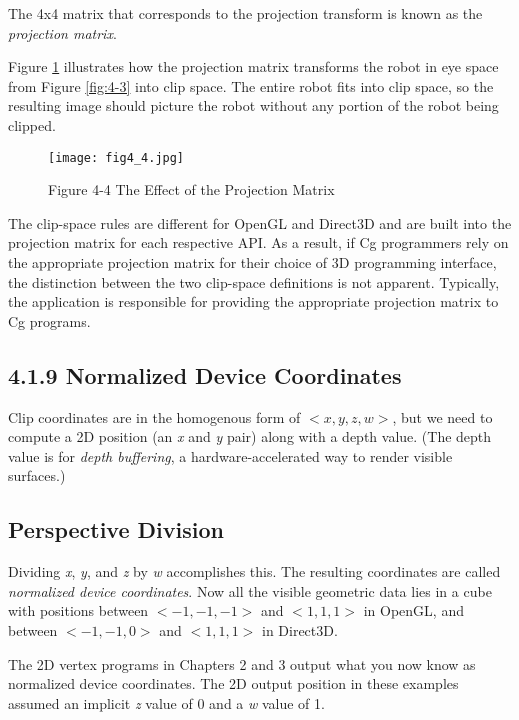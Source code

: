 \documentclass[../main.tex]{subfiles}
\begin{document}
The 4x4 matrix that corresponds to the projection transform is known as the \textit{projection matrix}.

Figure \ref{fig:4-4} illustrates how the projection matrix transforms the robot in eye space from Figure \ref{fig:4-3} into clip space. The entire robot fits into clip space, so the resulting image should picture the robot without any portion of the robot being clipped.

\begin{figure}
    \centering
    \texttt{[image: fig4\_4.jpg]}
    \caption{Figure 4-4 The Effect of the Projection Matrix}
    \label{fig:4-4}
\end{figure}

The clip-space rules are different for OpenGL and Direct3D and are built into the projection matrix for each respective API. As a result, if Cg programmers rely on the appropriate projection matrix for their choice of 3D programming interface, the distinction between the two clip-space definitions is not apparent. Typically, the application is responsible for providing the appropriate projection matrix to Cg programs.

\subsection{4.1.9 Normalized Device Coordinates}

Clip coordinates are in the homogenous form of $<x, y, z, w>$, but we need to compute a 2D position (an \textit{x} and \textit{y} pair) along with a depth value. (The depth value is for \textit{depth buffering}, a hardware-accelerated way to render visible surfaces.)

\subsection*{Perspective Division}

Dividing \textit{x}, \textit{y}, and \textit{z} by \textit{w} accomplishes this. The resulting coordinates are called \textit{normalized device coordinates}. Now all the visible geometric data lies in a cube with positions between $<-1, -1, -1>$ and $<1, 1, 1>$ in OpenGL, and between $<-1, -1, 0>$ and $<1, 1, 1>$ in Direct3D.

The 2D vertex programs in Chapters 2 and 3 output what you now know as normalized device coordinates. The 2D output position in these examples assumed an implicit \textit{z} value of 0 and a \textit{w} value of 1.
\end{document}
